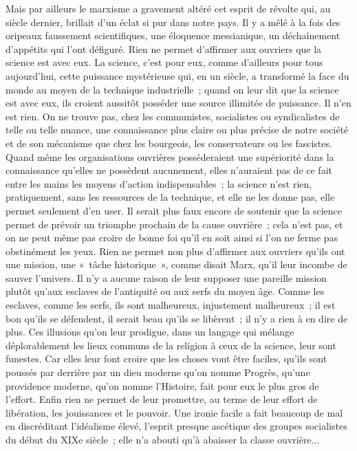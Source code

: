 \documentclass[french,twoside]{book} %
\begin{document}
Mais par ailleurs le marxisme a gravement altéré cet esprit de révolte qui, au siècle dernier, brillait d'un éclat si pur dans notre pays. Il y a mêlé à la fois des oripeaux faussement scientifiques, une éloquence messianique, un déchaînement d'appétits qui l'ont défiguré. Rien ne permet d'affirmer aux ouvriers que la science est avec eux. La science, c'est pour eux, comme d'ailleurs pour tous aujourd'hui, cette puissance mystérieuse qui, en un siècle, a transformé la face du monde au moyen de la technique industrielle ; quand on leur dit que la science est avec eux, ils croient aussitôt posséder une source illimitée de puissance. Il n'en est rien. On ne trouve pas, chez les communistes, socialistes ou syndicalistes de telle ou telle nuance, une connaissance plus claire ou plus précise de notre société et de son mécanisme que chez les bourgeois, les conservateurs ou les fascistes. Quand même les organisations ouvrières posséderaient une supériorité dans la connaissance qu'elles ne possèdent aucunement, elles n'auraient pas de ce fait entre les mains les moyens d'action indispensables ; la science n'est rien, pratiquement, sans les ressources de la technique, et elle ne les donne pas, elle permet seulement d'en user. Il serait plus faux encore de soutenir que la science permet de prévoir un triomphe prochain de la cause ouvrière ; cela n'est pas, et on ne peut même pas croire de bonne foi qu'il en soit ainsi si l'on ne ferme pas obstinément les yeux. Rien ne permet non plus d'affirmer aux ouvriers qu'ils ont une mission, une « tâche historique », comme disait Marx, qu'il leur incombe de sauver l'univers. Il n'y a aucune raison de leur supposer une pareille mission plutôt qu'aux esclaves de l'antiquité ou aux serfs du moyen âge. Comme les esclaves, comme les serfs, ils sont malheureux, injustement malheureux ; il est bon qu'ils se défendent, il serait beau qu'ils se libèrent ; il n'y a rien à en dire de plus. Ces illusions qu'on leur prodigue, dans un langage qui mélange déplorablement les lieux communs de la religion à ceux de la science, leur sont funestes. Car elles leur font croire que les choses vont être faciles, qu'ils sont poussés par derrière par un dieu moderne qu'on nomme Progrès, qu'une providence moderne, qu'on nomme l’Histoire, fait pour eux le plus gros de l'effort. Enfin rien ne permet de leur promettre, au terme de leur effort de libération, les jouissances et le pouvoir. Une ironie facile a fait beaucoup de mal en discréditant l'idéalisme élevé, l'esprit presque ascétique des groupes socialistes du début du XIXe siècle ; elle n'a abouti qu'à abaisser la classe ouvrière...\par
\end{document}
